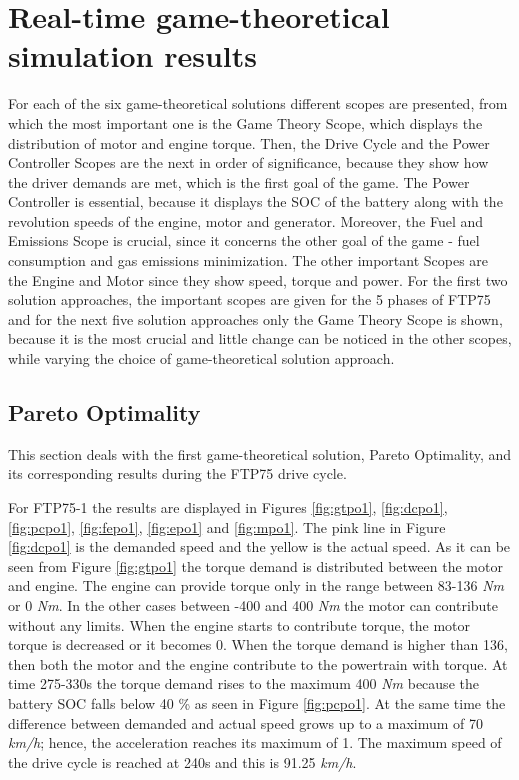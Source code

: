 \section{Real-time game-theoretical simulation results}

For each of the six game-theoretical solutions different scopes are presented, from which the most important one is the Game Theory Scope, which displays the distribution of motor and engine torque. Then, the Drive Cycle and the Power Controller Scopes are the next in order of significance, because they show how the driver demands are met, which is the first goal of the game. The Power Controller is essential, because it displays the SOC of the battery along with the revolution speeds of the engine, motor and generator. Moreover, the Fuel and Emissions Scope is crucial, since it concerns the other goal of the game - fuel consumption and gas emissions minimization. The other important Scopes are the Engine and Motor since they show speed, torque and power. For the first two solution approaches, the important scopes are given for the 5 phases of FTP75 and for the next five solution approaches only the Game Theory Scope is shown, because it is the most crucial and little change can be noticed in the other scopes, while varying the choice of game-theoretical solution approach.

\subsection{Pareto Optimality}
This section deals with the first game-theoretical solution, Pareto Optimality, and its corresponding results during the FTP75 drive cycle. 

For FTP75-1 the results are displayed in Figures \ref{fig:gtpo1}, \ref{fig:dcpo1}, \ref{fig:pcpo1}, \ref{fig:fepo1}, \ref{fig:epo1} and \ref{fig:mpo1}. The pink line in Figure \ref{fig:dcpo1} is the demanded speed and the yellow is the actual speed. As it can be seen from Figure \ref{fig:gtpo1} the torque demand is distributed between the motor and engine. The engine can provide torque only in the range between 83-136 \textit{Nm} or 0 \textit{Nm}. In the other cases between -400 and 400 \textit{Nm} the motor can contribute without any limits. When the engine starts to contribute torque, the motor torque is decreased or it becomes 0. When the torque demand is higher than 136, then both the motor and the engine contribute to the powertrain with torque. At time 275-330s the torque demand rises to the maximum 400 \textit{Nm} because the battery SOC falls below 40 \% as seen in Figure \ref{fig:pcpo1}. At the same time the difference between demanded and actual speed grows up to a maximum of 70 \textit{km/h}; hence, the acceleration reaches its maximum of 1. The maximum speed of the drive cycle is reached at 240s and this is 91.25 \textit{km/h}. 

